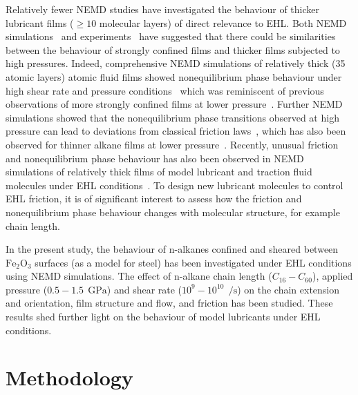 \documentclass[5p]{elsarticle}
\begin{document}
Relatively fewer NEMD studies have investigated the behaviour of thicker lubricant films ($\geq 10$ molecular layers) of direct relevance to EHL. Both NEMD simulations~\cite{Thompson1992,Robbins1996} and experiments~\cite{VanAlsten1988} have suggested that there could be similarities between the behaviour of strongly confined films and thicker films subjected to high pressures. Indeed, comprehensive NEMD simulations of relatively thick (35 atomic layers) atomic fluid films showed nonequilibrium phase behaviour under high shear rate and pressure conditions~\cite{Heyes2012,Gattinoni2013} which was reminiscent of previous observations of more strongly confined films at lower pressure~\cite{Thompson1990}. Further NEMD simulations showed that the nonequilibrium phase transitions observed at high pressure can lead to deviations from classical friction laws~\cite{Mackowiak2016}, which has also been observed for thinner alkane films at lower pressure~\cite{Sivebaek2010}. Recently, unusual friction and nonequilibrium phase behaviour has also been observed in NEMD simulations of relatively thick films of model lubricant and traction fluid molecules under EHL conditions~\cite{Ewen2017a}. To design new lubricant molecules to control EHL friction, it is of significant interest to assess how the friction and nonequilibrium phase behaviour changes with molecular structure, for example chain length.

In the present study, the behaviour of n-alkanes confined and sheared between $\text{Fe}_2\text{O}_3$ surfaces (as a model for steel) has been investigated under EHL conditions using NEMD simulations. The effect of n-alkane chain length ($C_{16} - C_{60}$), applied pressure ($0.5 - 1.5~\SI{}{\giga\pascal}$) and shear rate ($10^{9} - 10^{10} ~\SI{}{\per\second}$) on the chain extension and orientation, film structure and flow, and friction has been studied. These results shed further light on the behaviour of model lubricants under EHL conditions.


\section{Methodology}
\label{method}
\end{document}
